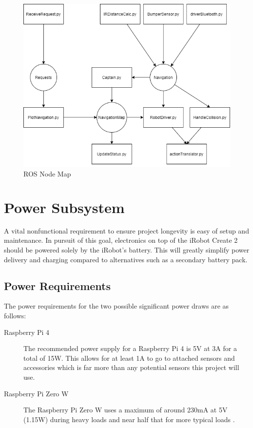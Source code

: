 \documentclass[12pt]{report}
\begin{document}
\begin{figure}[H]
\caption{ROS Node Map}
\centering
\includegraphics[scale=0.6]{images/ROSNodeMap.png}
\centering
\end{figure}


\section{Power Subsystem}
A vital nonfunctional requirement to ensure project longevity is easy of setup and maintenance. In pursuit of this goal, electronics on top of the iRobot Create 2 should be powered solely by the iRobot's battery. This will greatly simplify power delivery and charging compared to alternatives such as a secondary battery pack.

\subsection{Power Requirements}
The power requirements for the two possible significant power draws are as follows:
\begin{description}
    \item[Raspberry Pi 4] The recommended power supply for a Raspberry Pi 4 is 5V at 3A\cite{Pi4Specs} for a total of 15W. This allows for at least 1A to go to attached sensors and accessories which is far more than any potential sensors this project will use.
    \item[Raspberry Pi Zero W] The Raspberry Pi Zero W uses a maximum of around 230mA at 5V (1.15W) during heavy loads and near half that for more typical loads \cite{PiZeroPower}.
\end{description}
\end{document}
